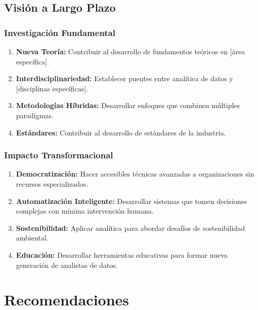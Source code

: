 \subsection{Visión a Largo Plazo}

\subsubsection{Investigación Fundamental}

\begin{enumerate}
    \item \textbf{Nueva Teoría:} Contribuir al desarrollo de fundamentos teóricos en [área específica].
    
    \item \textbf{Interdisciplinariedad:} Establecer puentes entre analítica de datos y [disciplinas específicas].
    
    \item \textbf{Metodologías Híbridas:} Desarrollar enfoques que combinen múltiples paradigmas.
    
    \item \textbf{Estándares:} Contribuir al desarrollo de estándares de la industria.
\end{enumerate}

\subsubsection{Impacto Transformacional}

\begin{enumerate}
    \item \textbf{Democratización:} Hacer accesibles técnicas avanzadas a organizaciones sin recursos especializados.
    
    \item \textbf{Automatización Inteligente:} Desarrollar sistemas que tomen decisiones complejas con mínima intervención humana.
    
    \item \textbf{Sostenibilidad:} Aplicar analítica para abordar desafíos de sostenibilidad ambiental.
    
    \item \textbf{Educación:} Desarrollar herramientas educativas para formar nueva generación de analistas de datos.
\end{enumerate}

\section{Recomendaciones}

